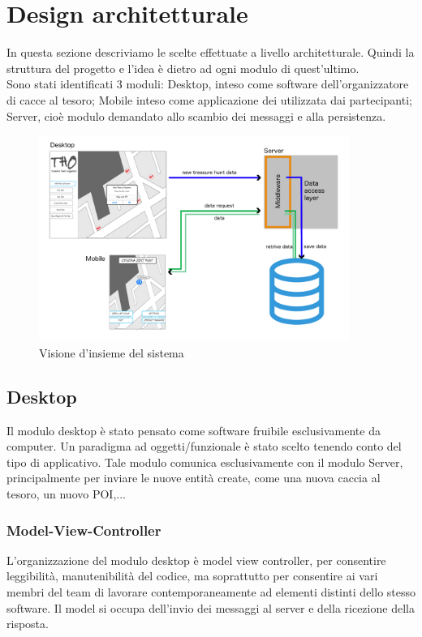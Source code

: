 \documentclass[12pt, italian]{article}
\begin{document}
\newpage
\section{Design architetturale}
In questa sezione descriviamo le scelte effettuate a livello architetturale. Quindi la struttura del progetto e l'idea è dietro ad ogni modulo di quest'ultimo.\\
Sono stati identificati 3 moduli: Desktop, inteso come software dell'organizzatore di cacce al tesoro; Mobile inteso come applicazione dei utilizzata dai partecipanti; Server, cioè modulo demandato allo scambio dei messaggi e alla persistenza.

\begin{figure}[H]
	\centering
	\includegraphics[width=0.9\textwidth]{img/architetturale01.png}
	\caption{Visione d'insieme del sistema}
\end{figure}

\subsection{Desktop}
Il modulo desktop è stato pensato come software fruibile esclusivamente da computer. Un paradigma ad oggetti/funzionale è stato scelto tenendo conto del tipo di applicativo. Tale modulo  comunica esclusivamente con il modulo Server, principalmente per inviare le nuove entità create, come una nuova caccia al tesoro, un nuovo POI,...
\subsubsection{Model-View-Controller}
L'organizzazione del modulo desktop è model view controller, per consentire leggibilità, manutenibilità del codice, ma soprattutto per consentire ai vari membri del team di lavorare contemporaneamente ad elementi distinti dello stesso software.
Il model si occupa dell'invio dei messaggi al server e della ricezione della risposta.
\end{document}
